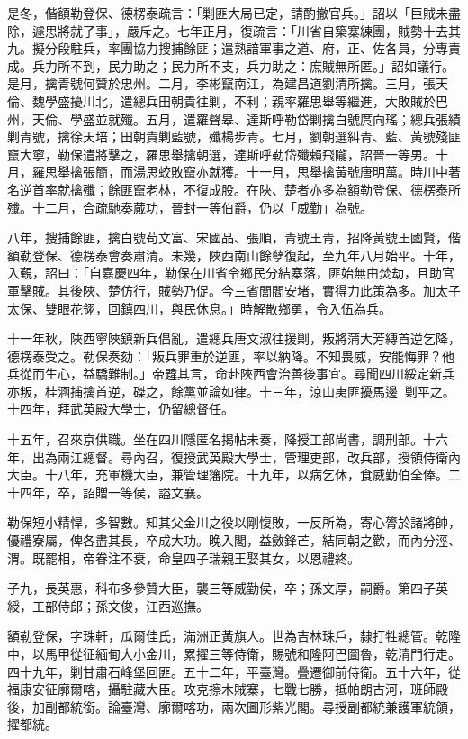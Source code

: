 \begin{pinyinscope}
是冬，偕額勒登保、德楞泰疏言：「剿匪大局已定，請酌撤官兵。」詔以「巨賊未盡除，遽思將就了事」，嚴斥之。七年正月，復疏言：「川省自築寨練團，賊勢十去其九。擬分段駐兵，率團協力搜捕餘匪；遣熟諳軍事之道、府，正、佐各員，分專責成。兵力所不到，民力助之；民力所不支，兵力助之：庶賊無所匿。」詔如議行。是月，擒青號何贊於忠州。二月，李彬竄南江，為建昌道劉清所擒。三月，張天倫、魏學盛擾川北，遣總兵田朝貴往剿，不利；親率羅思舉等繼進，大敗賊於巴州，天倫、學盛並就殲。五月，遣羅聲皋、達斯呼勒岱剿擒白號庹向瑤；總兵張績剿青號，擒徐天培；田朝貴剿藍號，殲楊步青。七月，劉朝選糾青、藍、黃號殘匪竄大寧，勒保遣將擊之，羅思舉擒朝選，達斯呼勒岱殲賴飛隴，詔晉一等男。十月，羅思舉擒張簡，而湯思蛟敗竄亦就獲。十一月，思舉擒黃號唐明萬。時川中著名逆首率就擒殲；餘匪竄老林，不復成股。在陜、楚者亦多為額勒登保、德楞泰所殲。十二月，合疏馳奏蕆功，晉封一等伯爵，仍以「威勤」為號。

八年，搜捕餘匪，擒白號茍文富、宋國品、張順，青號王青，招降黃號王國賢，偕額勒登保、德楞泰會奏肅清。未幾，陜西南山餘孽復起，至九年八月始平。十年，入覲，詔曰：「自嘉慶四年，勒保在川省令鄉民分結寨落，匪始無由焚劫，且助官軍擊賊。其後陜、楚仿行，賊勢乃促。今三省閭閻安堵，實得力此策為多。加太子太保、雙眼花翎，回鎮四川，與民休息。」時解散鄉勇，令入伍為兵。

十一年秋，陜西寧陜鎮新兵倡亂，遣總兵唐文淑往援剿，叛將蒲大芳縛首逆乞降，德楞泰受之。勒保奏劾：「叛兵罪重於逆匪，率以納降。不知畏威，安能悔罪？他兵從而生心，益驕難制。」帝韙其言，命赴陜西會治善後事宜。尋聞四川綏定新兵亦叛，桂涵捕擒首逆，磔之，餘黨並論如律。十三年，涼山夷匪擾馬邊，剿平之。十四年，拜武英殿大學士，仍留總督任。

十五年，召來京供職。坐在四川隱匿名揭帖未奏，降授工部尚書，調刑部。十六年，出為兩江總督。尋內召，復授武英殿大學士，管理吏部，改兵部，授領侍衛內大臣。十八年，充軍機大臣，兼管理籓院。十九年，以病乞休，食威勤伯全俸。二十四年，卒，詔贈一等侯，謚文襄。

勒保短小精悍，多智數。知其父金川之役以剛愎敗，一反所為，寄心膂於諸將帥，優禮寮屬，俾各盡其長，卒成大功。晚入閣，益斂鋒芒，結同朝之歡，而內分涇、渭。既罷相，帝眷注不衰，命皇四子瑞親王娶其女，以恩禮終。

子九，長英惠，科布多參贊大臣，襲三等威勤侯，卒；孫文厚，嗣爵。第四子英綬，工部侍郎；孫文俊，江西巡撫。

額勒登保，字珠軒，瓜爾佳氏，滿洲正黃旗人。世為吉林珠戶，隸打牲總管。乾隆中，以馬甲從征緬甸大小金川，累擢三等侍衛，賜號和隆阿巴圖魯，乾清門行走。四十九年，剿甘肅石峰堡回匪。五十二年，平臺灣。疊遷御前侍衛。五十六年，從福康安征廓爾喀，攝駐藏大臣。攻克擦木賊寨，七戰七勝，抵帕朗古河，班師殿後，加副都統銜。論臺灣、廓爾喀功，兩次圖形紫光閣。尋授副都統兼護軍統領，擢都統。


\end{pinyinscope}

